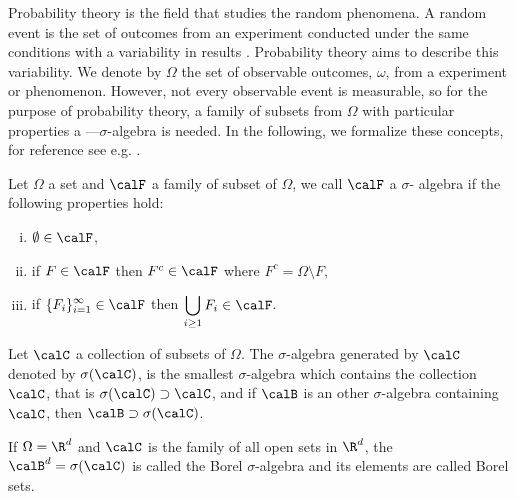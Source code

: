 Probability theory  is the field that  studies the random phenomena. A random event is the set of  outcomes from an 
experiment conducted under the same conditions  with a variability in results . Probability theory aims to 
describe  this variability. We denote by $\Omega$ the set of observable outcomes, $\omega$, from a
experiment or phenomenon.  However, not every observable event is measurable, so  for the purpose of probability 
theory, a family of subsets from $\Omega$ with particular properties  a ---$\sigma$-algebra is needed. In 
the following, we formalize these concepts, for reference see e.g. \cite{Resnick2003}.	
\begin{definition}
	Let $\Omega$ a set and $\calF$ a family of subset of $\Omega$, we call $\calF$ a 
	$\sigma$- algebra if the following properties hold:
	\begin{enumerate}[(i)]
		\item $\emptyset \in \calF$,
		\item if $F\in \calF$ then $F^c\in\calF$ where $F^c = \Omega \setminus F$,
		\item if $\displaystyle \{F_i\}_{i=1}^\infty \in \calF $ then 
			$\displaystyle \bigcup_{i\geq 1} F_i \in \calF$.
	\end{enumerate}
\end{definition}

	Let $\calC$ a collection of subsets of $\Omega$. The $\sigma$-algebra generated by $\calC$
denoted by $\sigma(\calC)$, is the smallest $\sigma$-algebra which contains the collection $\calC$, that is
$\sigma(\calC)\supset \calC$, and if $\calB$ is an other $\sigma$-algebra containing $\calC$, then
$\calB \supset \sigma(\calC)$.
\begin{definition}
	If $\Omega=\R^d$ and $\calC$ is the family of all open sets in $\R^d$,  the 
	$\calB^{d}=\sigma(\calC)$ is called the Borel $\sigma$-algebra and its elements are called Borel sets.
\end{definition}
	
